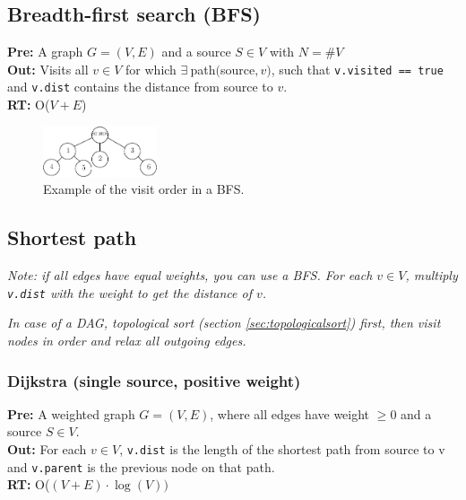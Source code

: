 \documentclass[a4paper,10pt]{article}
\begin{document}
\begin{multicols}{2}
\subsection{Breadth-first search (BFS)}
\textbf{Pre:} A graph $G=(V,E)$ and a source $S\in V$ with $N=\#V$\\
\textbf{Out:} Visits all $v\in V$ for which $\exists\ $path$($source$, v)$, such that \lstinline|v.visited == true| and \lstinline|v.dist| contains the distance from source to $v$.
\\
\textbf{RT:} O($V+E$)
\vspace{-15pt}
\begin{figure}[H]
\centering
\includegraphics[width=0.3\textwidth]{figures/bfsvisit.eps}
\caption{Example of the visit order in a BFS.}
\end{figure}\vspace{-12pt}


\subsection{Shortest path}
\textit{Note: if all edges have equal weights, you can use a BFS. For each $v\in V$, multiply \lstinline|v.dist| with the weight to get the distance of $v$.}

\textit{In case of a DAG, topological sort (section \ref{sec:topologicalsort}) first, then visit nodes in order and relax all outgoing edges.}
\subsubsection{Dijkstra (single source, positive weight)}
\textbf{Pre:} A weighted graph $G=(V,E)$, where all edges have weight $\geq0$ and a source $S\in V$.\\
\textbf{Out:} For each $v\in V$, \lstinline|v.dist| is the length of the shortest path from source to v and \lstinline|v.parent| is the previous node on that path.\\
\textbf{RT:} O($(V+E)\cdot\log(V))$



\end{multicols}
\end{document}
